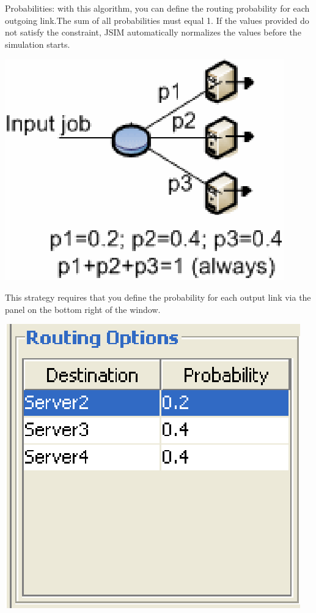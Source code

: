 \begin{description*}
\item[Probabilities:] with this algorithm, you can define the routing probability for each outgoing link.The sum of all probabilities must equal 1. If the values provided do not satisfy the constraint, JSIM automatically normalizes the values before the simulation starts.
\begin{center}
\includegraphics[scale=.5]{img/jsim/probability.eps}
\end{center}
This strategy requires that you define the probability for each
output link via the panel on the bottom right of the window.
\begin{center}
\includegraphics[scale=.5]{img/jsim/prob1.eps}

\end{center}
\end{description*}
